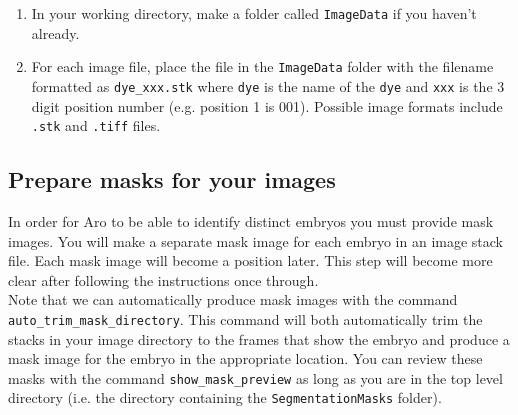 \documentclass[titlepage,11pt]{article}
\begin{document}
\begin{enumerate}
\item In your working directory, make a folder called \texttt{ImageData} if you haven't already.
\item For each image file, place the file in the \texttt{ImageData} folder with the filename formatted as \texttt{dye\_xxx.stk} where \texttt{dye} is the name of the \texttt{dye} and \texttt{xxx} is the 3 digit position number (e.g. position 1 is 001). Possible image formats include \texttt{.stk} and \texttt{.tiff} files.
\end{enumerate}

\subsection{Prepare masks for your images} \label{sec:maskprep}


In order for Aro to be able to identify distinct embryos you must provide mask images. You will make a separate mask image for each embryo in an image stack file. Each mask image will become a position later. This step will become more clear after following the instructions once through.\\

Note that we can automatically produce mask images with the command \texttt{auto\_trim\_mask\_directory}. This command will both automatically trim the stacks in your image directory to the frames that show the embryo and produce a mask image for the embryo in the appropriate location. You can review these masks with the command \texttt{show\_mask\_preview} as long as you are in the top level directory (i.e. the directory containing the \texttt{SegmentationMasks} folder).
\end{document}
